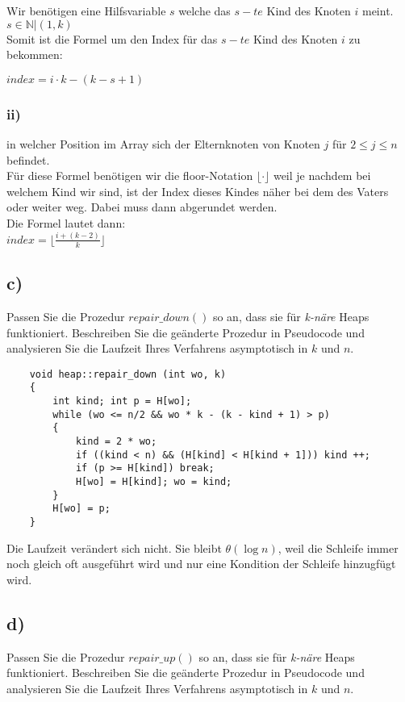 \documentclass[a4paper]{article}
\begin{document}
Wir benötigen eine Hilfsvariable $s$ welche das $s-te$ Kind des Knoten $i$ meint.\\

$s \in \mathbb{N} | (1, k)$\\

Somit ist die Formel um den Index für das $s-te$ Kind des Knoten $i$ zu bekommen:

$index = i \cdot k - (k-s + 1)$

\subsubsection*{ii)}
in welcher Position im Array sich der Elternknoten von Knoten $j$ für $2 \leq j \leq n$ befindet.\\

Für diese Formel benötigen wir die floor-Notation $\lfloor \cdot \rfloor$ weil je nachdem bei welchem Kind wir sind, ist der Index dieses Kindes näher bei dem des Vaters oder weiter weg. Dabei muss dann abgerundet werden.\\

Die Formel lautet dann:\\

$index = \lfloor \frac{i + (k - 2)}{k}\rfloor$

\subsection*{c)}
Passen Sie die Prozedur $repair\_down()$ so an, dass sie für \textit{k-näre} Heaps funktioniert. Beschreiben Sie
die geänderte Prozedur in Pseudocode und analysieren Sie die Laufzeit Ihres Verfahrens asymptotisch in $k$ und $n$.

\begin{verbatim}
    void heap::repair_down (int wo, k)
    {
        int kind; int p = H[wo];
        while (wo <= n/2 && wo * k - (k - kind + 1) > p)
        {
            kind = 2 * wo;
            if ((kind < n) && (H[kind] < H[kind + 1])) kind ++;
            if (p >= H[kind]) break;
            H[wo] = H[kind]; wo = kind;
        }
        H[wo] = p;
    }
\end{verbatim}

Die Laufzeit verändert sich nicht. Sie bleibt $\theta(\log n)$, weil die Schleife immer noch gleich oft ausgeführt wird und nur eine Kondition der Schleife hinzugfügt wird.

\subsection*{d)}
Passen Sie die Prozedur $repair\_up()$ so an, dass sie für \textit{k-näre} Heaps funktioniert. Beschreiben
Sie die geänderte Prozedur in Pseudocode und analysieren Sie die Laufzeit Ihres Verfahrens
asymptotisch in $k$ und $n$.
\end{document}
